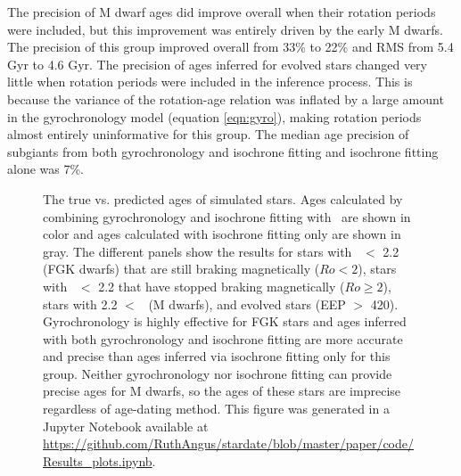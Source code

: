 The precision of M dwarf ages did improve overall when their rotation periods
were included, but this improvement was entirely driven by the early M dwarfs.
The precision of this group improved overall from 33\% to 22\% and RMS from
5.4 Gyr to 4.6 Gyr.
The precision of ages inferred for evolved stars changed very little when
rotation periods were included in the inference process.
This is because the variance of the rotation-age relation was inflated by a
large amount in the gyrochronology model (equation \ref{eqn:gyro}), making
rotation periods almost entirely uninformative for this group.
The median age precision of subgiants from both gyrochronology and isochrone
fitting and isochrone fitting alone was 7\%.

\begin{figure}
  \caption{
The true vs. predicted ages of simulated stars.
    Ages calculated by combining gyrochronology
    and isochrone fitting with \sd\ are shown in color and ages calculated with
    isochrone fitting only are shown in gray.
The different panels show the results for stars
    with \gcolor\ $<$ 2.2 (FGK dwarfs) that are still braking magnetically
    ($Ro < 2$), stars with \gcolor\ $<$ 2.2 that have stopped braking
    magnetically ($Ro \geq 2$),
    stars with 2.2 $<$ \gcolor\ (M dwarfs), and evolved stars (EEP $>$ 420).
Gyrochronology is highly effective for FGK stars and ages inferred with both
    gyrochronology and isochrone fitting are more accurate and precise than
    ages inferred via isochrone fitting only for this group.
Neither gyrochronology nor isochrone fitting can provide precise ages for
    M dwarfs, so the ages of these stars are imprecise regardless of
    age-dating method.
    This figure was generated in a Jupyter Notebook available at
    \url{https://github.com/RuthAngus/stardate/blob/master/paper/code/Results_plots.ipynb}.
}
  \centering

\end{figure}
